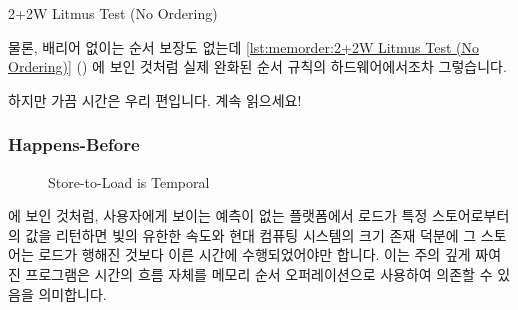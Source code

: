 {	\fi

\begin{listing}[tbp]

\caption{2+2W Litmus Test (No Ordering)}
\label{lst:memorder:2+2W Litmus Test (No Ordering)}
\end{listing}

	물론, 배리어 없이는 순서 보장도 없는데
	\cref{lst:memorder:2+2W Litmus Test (No Ordering)}
	() 에 보인 것처럼 실제 완화된 순서 규칙의
	하드웨어에서조차 그렇습니다.

}\QuickQuizEnd

하지만 가끔 시간은 우리 편입니다.  계속 읽으세요!

\subsubsection{Happens-Before}
\label{sec:memorder:Happens-Before}

\begin{figure}[tbp]
\centering
{}
\caption{Store-to-Load is Temporal}
\label{fig:memorder:Store-to-Load is Temporal}
\end{figure}

 에 보인 것처럼, 사용자에게 보이는
예측이 없는 플랫폼에서 로드가 특정 스토어로부터의 값을 리턴하면 빛의 유한한
속도와 현대 컴퓨팅 시스템의 크기 존재 덕분에 그 스토어는 로드가 행해진 것보다
이른 시간에 수행되었어야만 합니다.
이는 주의 깊게 짜여진 프로그램은 시간의 흐름 자체를 메모리 순서 오퍼레이션으로
사용하여 의존할 수 있음을 의미합니다.

